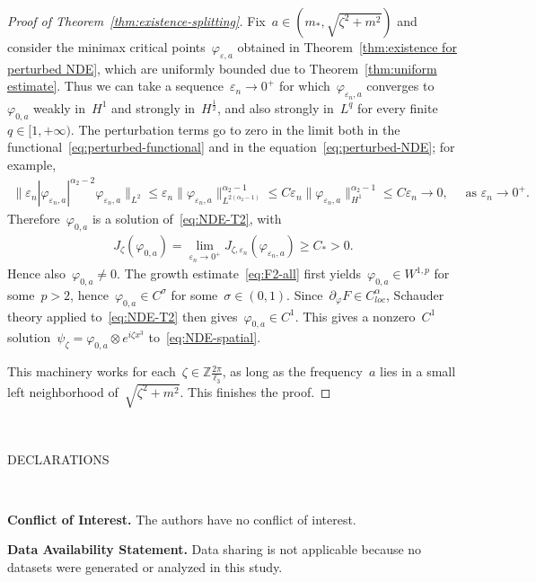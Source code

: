 \documentclass[11pt,final]{amsart}
\newcommand{\p}{\partial}
\newcommand{\eps}{\varepsilon}
\newcommand{\bZ}{\mathbb{Z}}
\begin{document}
\begin{proof}[Proof of Theorem~\ref{thm:existence-splitting}]
    Fix~$a\in (m_*,\sqrt{\zeta^2+m^2})$ and consider the minimax critical points~$\varphi_{\eps,a}$ obtained in Theorem~\ref{thm:existence for perturbed NDE}, which are uniformly bounded due to Theorem~\ref{thm:uniform estimate}. 
    Thus we can take a sequence~$\eps_n\to0^+$ for which~$\varphi_{\eps_n,a}$ converges to~$\varphi_{0,a}$ weakly in~$H^1$ and strongly in~$H^{\frac{1}{2}}$, and also strongly in~$L^q$ for every finite~$q\in [1,+\infty)$. 
    The perturbation terms go to zero in the limit both in the functional~\eqref{eq:perturbed-functional} and in the equation~\eqref{eq:perturbed-NDE}; for example,  
    \begin{align}
        \|\eps_n |\varphi_{\eps_n,a}|^{\alpha_2-2}\varphi_{\eps_n,a}\|_{L^2}
        \leq \eps_n \|\varphi_{\eps_n,a}\|_{L^{2(\alpha_2-1)}}^{\alpha_2 -1}
        \leq C\eps_n\|\varphi_{\eps_n,a}\|_{H^1}^{\alpha_2 -1} \leq C\eps_n\to 0, \quad \mbox{ as } \eps_n\to 0^+.        
    \end{align}
    Therefore~$\varphi_{0,a}$ is a solution of~\eqref{eq:NDE-T2}, with
    \begin{align}
        J_{\zeta}(\varphi_{0,a}) = \lim_{\eps_n\to 0^+} J_{\zeta,\eps_n}(\varphi_{\eps_n,a}) \geq C_*>0.
    \end{align}
    Hence also~$\varphi_{0,a}\neq 0$.
    The growth estimate~\eqref{eq:F2-all} first yields~$\varphi_{0,a}\in W^{1,p}$ for some~$p>2$, hence~$\varphi_{0,a}\in C^\sigma$ for some~$\sigma\in (0,1)$. 
    Since~$\p_\varphi F\in C^{\alpha}_{loc}$, Schauder theory applied to~\eqref{eq:NDE-T2} then gives~$\varphi_{0,a}\in C^1$. 
    This gives a nonzero~$C^1$ solution~$\psi_\zeta=\varphi_{0,a}\otimes e^{i\zeta x^3}$ to~\eqref{eq:NDE-spatial}. 

    This machinery works for each~$\zeta\in\bZ\frac{2\pi}{\ell_3}$, as long as the frequency~$a$ lies in a small left neighborhood of~$\sqrt{\zeta^2+m^2}$. This finishes the proof.   
\end{proof}

 


\ 

\begin{center}
    {\scriptsize DECLARATIONS}
\end{center} 

\

\textbf{Conflict of Interest.} The authors have no conflict of interest. 


\textbf{Data Availability Statement.} Data sharing is not applicable because no datasets were generated or analyzed in this study.

\ 






\end{document}
